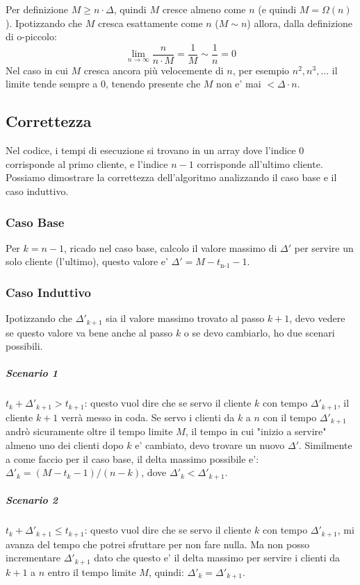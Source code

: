 \documentclass{article}
\begin{document}
Per definizione $M\geq n \cdot\Delta$, quindi $M$ cresce almeno come $n$ (e quindi $M = \Omega(n)$).  
Ipotizzando che $M$ cresca esattamente come $n$ ($M \sim n$) allora, dalla definizione di o-piccolo:
$$
\lim_{ n \to \infty } \frac{n}{n \cdot M} = \frac{1}{M} \sim \frac{1}{n} = 0
$$
Nel caso in cui $M$ cresca ancora più velocemente di $n$, per esempio $n^2, n^3, \dots$ il limite tende sempre a 0, tenendo presente che $M$ non e' mai $< \Delta \cdot n$.

\subsection{ Correttezza }
Nel codice, i tempi di esecuzione si trovano in un array dove l'indice $0$ corrisponde al primo cliente, e l'indice $n-1$ corrisponde all'ultimo cliente.
Possiamo dimostrare la correttezza dell'algoritmo analizzando il caso base e il caso induttivo.
\subsubsection{Caso Base}
Per $k=n-1$, ricado nel caso base, calcolo il valore massimo di $\Delta'$ per servire un solo cliente (l'ultimo), questo valore e' $\Delta' = M - t_{\text{n-1}} - 1$. 
\subsubsection{Caso Induttivo}
Ipotizzando che $\Delta'_{k+1}$ sia il valore massimo trovato al passo $k+1$, devo vedere se questo valore va bene anche al passo $k$ o se devo cambiarlo, ho due scenari possibili.
\subparagraph{Scenario 1}
$t_{k} + \Delta'_{k+1} > t_{k+1}$: questo vuol dire che se servo il cliente $k$ con tempo $\Delta'_{k+1}$, il cliente $k+1$ verrà messo in coda. Se servo i clienti da $k$ a $n$ con il tempo $\Delta'_{k+1}$ andrò sicuramente oltre il tempo limite $M$, il tempo in cui "inizio a servire" almeno uno dei clienti dopo $k$ e' cambiato, devo trovare un nuovo $\Delta'$. Similmente a come faccio per il caso base, il delta massimo possibile e': $\Delta'_{k} = (M-t_{k} -1) / (n-k)$, dove $\Delta'_{k} < \Delta'_{k+1}$.
\subparagraph{Scenario 2}
$t_{k} + \Delta'_{k+1} \leq t_{k+1}$: questo vuol dire che se servo il cliente $k$ con tempo $\Delta'_{k+1}$, mi avanza del tempo che potrei sfruttare per non fare nulla. Ma non posso incrementare $\Delta'_{k+1}$ dato che questo e' il delta massimo per servire i clienti da $k+1$ a $n$ entro il tempo limite $M$, quindi: $\Delta'_{k} = \Delta'_{k+1}$.
\end{document}
